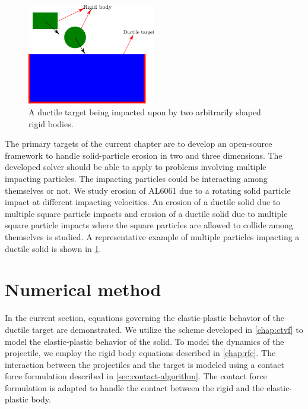 \begin{figure}[!htpb]
  \centering
  \includegraphics[width=0.5\textwidth]{images/erosion/images/intro/intro_description}
  \caption{A ductile target being impacted upon by two arbitrarily shaped rigid bodies.}
\label{fig:spe-intro}
\end{figure}
The primary targets of the current chapter are to develop an open-source framework
to handle solid-particle erosion in two and three dimensions. The developed
solver should be able to apply to problems involving multiple impacting
particles. The impacting particles could be interacting among themselves or not.
We study erosion of AL6061 due to a rotating solid particle impact at different
impacting velocities. An erosion of a ductile solid due to multiple square
particle impacts and erosion of a ductile solid due to multiple square
particle impacts where the square particles are allowed to collide among
themselves is studied. A representative example of multiple particles impacting
a ductile solid is shown in \cref{fig:spe-intro}.


\FloatBarrier%
\section{Numerical method}
\label{sec:erosion-numerical-method}
In the current section, equations governing the elastic-plastic behavior of the
ductile target are demonstrated. We utilize the scheme developed in
\cref{chap:ctvf} to model the elastic-plastic behavior of the solid. To model
the dynamics of the projectile, we employ the rigid body equations described in
\cref{chap:rfc}. The interaction between the projectiles and the target is
modeled using a contact force formulation described in
\cref{sec:contact-algorithm}. The contact force formulation is adapted to handle
the contact between the rigid and the elastic-plastic body.
